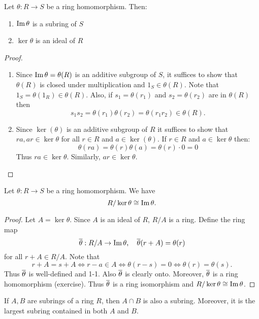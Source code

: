 \documentclass[11pt]{article}
\begin{document}
\begin{proposition}
    Let $\theta:R\to S$ be a ring homomorphism. Then:
    \begin{enumerate}
        \item $\operatorname{Im}\theta$ is a subring of $S$
        \item $\ker\theta$ is an ideal of $R$
    \end{enumerate}
\end{proposition}

\begin{proof}\,
    \begin{enumerate}
        \item Since $\operatorname{Im}\theta=\theta(R)$ is an additive subgroup of $S$, it suffices to show that $\theta(R)$ is closed under multiplication and $1_S\in\theta(R)$. Note that $1_S=\theta(1_R)\in\theta(R)$. Also, if $s_1=\theta(r_1)$ and $s_2=\theta(r_2)$ are in $\theta(R)$ then
        \[s_1s_2=\theta(r_1)\theta(r_2)=\theta(r_1r_2)\in\theta(R).\]
    
        \item Since $\ker(\theta)$ is an additive subgroup of $R$ it suffices to show that $ra,ar\in\ker\theta$ for all $r\in R$ and $a\in\ker(\theta)$. If $r\in R$ and $a\in\ker\theta$ then: $$\theta(ra)=\theta(r)\theta(a)=\theta(r)\cdot0=0$$
        Thus $ra\in\ker\theta$. Similarly, $ar\in\ker\theta$.
    \end{enumerate}
\end{proof}

\begin{theorem}
    Let $\theta:R\to S$ be a ring homomorphism. We have $$R/\ker\theta\cong\operatorname{Im}\theta.$$
\end{theorem}

\begin{proof}
    Let $A=\ker\theta$. Since $A$ is an ideal of $R$, $R/A$ is a ring. Define the ring map
    \[\overline\theta:R/A\to\operatorname{Im}\theta,\quad\overline{\theta}(r+A)=\theta(r)\]
    for all $r+A\in R/A$. Note that $$r+A=s+A\iff r-a\in A\iff \theta(r-s)=0\iff\theta(r)=\theta(s).$$
    Thus $\overline{\theta}$ is well-defined and 1-1. Also $\overline{\theta}$ is clearly onto. Moreover, $\overline{\theta}$ is a ring homomorphism (exercise). Thus $\overline{\theta}$ is a ring isomorphism and $R/\ker\theta\cong\operatorname{Im}\theta$.
\end{proof}

\begin{remark}
    If $A,B$ are subrings of a ring $R$, then $A\cap B$ is also a subring. Moreover, it is the largest subring contained in both $A$ and $B$.
\end{remark}
\end{document}

